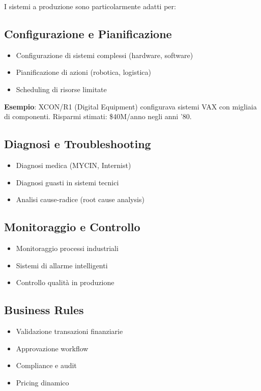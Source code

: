 I sistemi a produzione sono particolarmente adatti per:

\subsection{Configurazione e Pianificazione}

\begin{itemize}
\item Configurazione di sistemi complessi (hardware, software)
\item Pianificazione di azioni (robotica, logistica)
\item Scheduling di risorse limitate
\end{itemize}

\textbf{Esempio}: XCON/R1 (Digital Equipment) configurava sistemi VAX con migliaia di componenti. Risparmi stimati: \$40M/anno negli anni '80.

\subsection{Diagnosi e Troubleshooting}

\begin{itemize}
\item Diagnosi medica (MYCIN, Internist)
\item Diagnosi guasti in sistemi tecnici
\item Analisi cause-radice (root cause analysis)
\end{itemize}

\subsection{Monitoraggio e Controllo}

\begin{itemize}
\item Monitoraggio processi industriali
\item Sistemi di allarme intelligenti
\item Controllo qualità in produzione
\end{itemize}

\subsection{Business Rules}

\begin{itemize}
\item Validazione transazioni finanziarie
\item Approvazione workflow
\item Compliance e audit
\item Pricing dinamico
\end{itemize}

